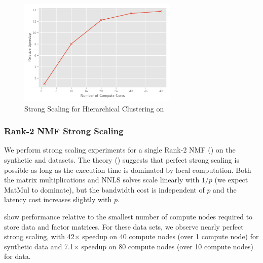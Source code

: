 \begin{figure}
\begin{center}
\includegraphics[height=2in, width=\columnwidth]{plots/dc_hierarchical_speedup.pdf}
\caption{Strong Scaling for Hierarchical Clustering on \hyper{}}
\label{fig:dcspeedup}
\end{center}
\end{figure}


\subsubsection{Rank-2 NMF Strong Scaling}

We perform strong scaling experiments for a single Rank-2 NMF () on the synthetic and \image{} datasets.
The theory () suggests that perfect strong scaling is possible as long as the execution time is dominated by local computation.
Both the matrix multiplications and NNLS solves scale linearly with $1/p$ (we expect MatMul to dominate), but the bandwidth cost is independent of $p$ and the latency cost increases slightly with $p$.

 show performance relative to the smallest number of compute nodes required to store data and factor matrices.
For these data sets, we observe nearly perfect strong scaling, with 42$\times$ speedup on 40 compute nodes (over 1 compute node) for synthetic data and 7.1$\times$ speedup on 80 compute nodes (over 10 compute nodes) for \image{} data.

